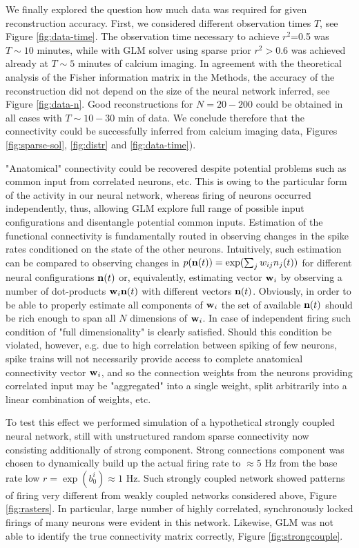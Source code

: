 We finally explored the question how much data was required for given reconstruction accuracy. First, we considered different observation times $T$, see Figure \ref{fig:data-time}. The observation time necessary to achieve $r^2$=0.5 was $T\sim 10$ minutes, while with GLM solver using sparse prior $r^2>0.6$ was achieved already at $T\sim 5$ minutes of calcium imaging. In agreement with the theoretical analysis of the Fisher information matrix in the Methods, the accuracy of the reconstruction did not depend on the size of the neural network inferred, see Figure \ref{fig:data-n}. Good reconstructions for $N=20-200$ could be obtained in all cases with $T\sim 10-30$ min of data. We conclude therefore that the connectivity could be successfully inferred from calcium imaging data, Figures \ref{fig:sparse-sol}, \ref{fig:distr} and \ref{fig:data-time}).

"Anatomical" connectivity could be recovered despite potential problems such as common input from correlated neurons, etc. This is owing to the particular form of the activity in our neural network, whereas firing of neurons occurred independently, thus, allowing GLM explore full range of possible input configurations and disentangle potential common inputs.  Estimation of the functional connectivity is fundamentally routed in observing changes in the spike rates conditioned on the state of the other neurons. Intuitively, such estimation can be compared to observing changes in $p({\bf n}(t))=\exp(\sum_j w_{ij}n_j(t))$ for different neural configurations ${\bf n}(t)$ or, equivalently, estimating vector ${\bf w}_i$ by observing a number of dot-products ${\bf w}_i {\bf n}(t)$ with different vectors ${\bf n}(t)$. Obviously, in order to be able to properly estimate all components of ${\bf w}_i$ the set of available ${\bf n}(t)$ should be rich enough to span all $N$ dimensions of ${\bf w}_i$. In case of independent firing such condition of "full dimensionality" is clearly satisfied.  Should this condition be violated, however, e.g. due to high correlation between spiking of few neurons, spike trains will not necessarily provide access to complete anatomical connectivity vector ${\bf w}_i$, and so the connection weights from the neurons providing correlated input may be "aggregated" into a single weight, split arbitrarily into a linear combination of weights, etc.

To test this effect we performed simulation of a hypothetical strongly coupled  neural network, still with unstructured random sparse connectivity now consisting additionally of strong component. Strong connections component was chosen to dynamically build up the actual firing rate to $\approx 5$ Hz from the base rate low $r=\exp(b^i_0)\approx 1$ Hz. Such strongly coupled network showed patterns of firing very different from weakly coupled networks considered above, Figure \ref{fig:rasters}.  In particular, large number of highly correlated, synchronously locked firings of many neurons were evident in this network.  Likewise, GLM was not able to identify the true connectivity matrix correctly, Figure \ref{fig:strongcouple}. 

